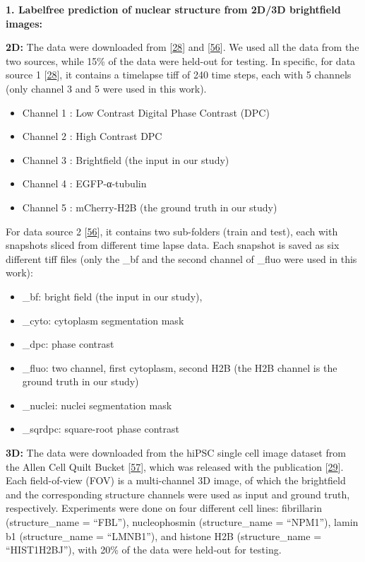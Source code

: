 \textbf{1. Labelfree prediction of nuclear structure from 2D/3D brightfield images:}

\textbf{2D:} The data were downloaded from {[}\protect\hyperlink{ref-xv2VIyRP}{28}{]} and {[}\protect\hyperlink{ref-8ywSgqrJ}{56}{]}. We used all the data from the two sources, while 15\% of the data were held-out for testing. In specific, for data source 1 {[}\protect\hyperlink{ref-xv2VIyRP}{28}{]}, it contains a timelapse tiff of 240 time steps, each with 5 channels (only channel 3 and 5 were used in this work).

\begin{itemize}
\tightlist
\item
  Channel 1 : Low Contrast Digital Phase Contrast (DPC)
\item
  Channel 2 : High Contrast DPC
\item
  Channel 3 : Brightfield (the input in our study)
\item
  Channel 4 : EGFP-α-tubulin
\item
  Channel 5 : mCherry-H2B (the ground truth in our study)
\end{itemize}

For data source 2 {[}\protect\hyperlink{ref-8ywSgqrJ}{56}{]}, it contains two sub-folders (train and test), each with snapshots sliced from different time lapse data. Each snapshot is saved as six different tiff files (only the \_bf and the second channel of \_fluo were used in this work):

\begin{itemize}
\tightlist
\item
  \_bf: bright field (the input in our study),
\item
  \_cyto: cytoplasm segmentation mask
\item
  \_dpc: phase contrast
\item
  \_fluo: two channel, first cytoplasm, second H2B (the H2B channel is the ground truth in our study)
\item
  \_nuclei: nuclei segmentation mask
\item
  \_sqrdpc: square-root phase contrast
\end{itemize}

\textbf{3D:} The data were downloaded from the hiPSC single cell image dataset from the Allen Cell Quilt Bucket {[}\protect\hyperlink{ref-vm45dW9e}{57}{]}, which was released with the publication {[}\protect\hyperlink{ref-5sGcmDuy}{29}{]}. Each field-of-view (FOV) is a multi-channel 3D image, of which the brightfield and the corresponding structure channels were used as input and ground truth, respectively. Experiments were done on four different cell lines: fibrillarin (structure\_name = ``FBL''), nucleophosmin (structure\_name = ``NPM1''), lamin b1 (structure\_name = ``LMNB1''), and histone H2B (structure\_name = ``HIST1H2BJ''), with 20\% of the data were held-out for testing.

